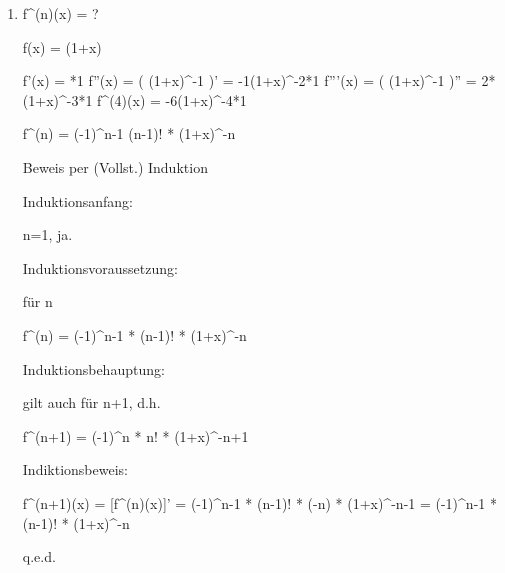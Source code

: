 \begin{enumerate}
\item %

f^{(n)}(x) = ?

f(x) = \ln(1+x)

f'(x)  = *1
f''(x) = ( (1+x)^{-1} )'
 = -1(1+x)^{-2}*1
f'''(x) = ( (1+x)^{-1} )''
 = 2*(1+x)^-3*1
f^{(4)}(x) = -6(1+x)^{-4}*1

f^{(n)} = (-1)^{n-1} (n-1)! * (1+x)^{-n}

Beweis per (Vollst.) Induktion

Induktionsanfang:

n=1, ja.

Induktionsvoraussetzung:

für n \in \N

f^{(n)} = (-1)^{n-1} * (n-1)! * (1+x)^{-n}

Induktionsbehauptung:

gilt auch für n+1, d.h.

f^{(n+1)} = (-1)^{n} * n! * (1+x)^{-n+1}

Indiktionsbeweis:

f^{(n+1)}(x) = [f^{(n)}(x)]'
= (-1)^{n-1} * (n-1)! * (-n) * (1+x)^{-n-1} %
= (-1)^{n-1} * (n-1)! * (1+x)^{-n}

q.e.d.


\end{enumerate}




